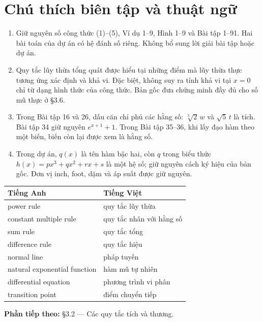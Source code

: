 \documentclass[12pt,a4paper]{article}
\begin{document}
\section*{Chú thích biên tập và thuật ngữ}
\begin{enumerate}[leftmargin=*]
\item Giữ nguyên số công thức (1)–(5), Ví dụ 1–9, Hình 1–9 và Bài tập 1–91. Hai bài toán của dự án có hệ đánh số riêng. Không bổ sung lời giải bài tập hoặc dự án.
\item Quy tắc lũy thừa tổng quát được hiểu tại những điểm mà lũy thừa thực tương ứng xác định và khả vi. Đặc biệt, không suy ra tính khả vi tại $x=0$ chỉ từ dạng hình thức của công thức. Bản gốc đưa chứng minh đầy đủ cho số mũ thực ở §3.6.
\item Trong Bài tập 16 và 26, dấu căn chỉ phủ các hằng số: $\sqrt[3]{2}\,w$ và $\sqrt5\,t$ là tích. Bài tập 34 giữ nguyên $e^{x+1}+1$. Trong Bài tập 35–36, khi lấy đạo hàm theo một biến, biến còn lại được xem là hằng số.
\item Trong dự án, $q(x)$ là tên hàm bậc hai, còn $q$ trong biểu thức $h(x)=px^3+qx^2+rx+s$ là một hệ số; giữ nguyên cách ký hiệu của bản gốc. Đơn vị inch, foot, dặm và áp suất được giữ nguyên.
\end{enumerate}
\begin{center}\begin{tabular}{ll}\toprule
Tiếng Anh&Tiếng Việt\\\midrule
power rule&quy tắc lũy thừa\\
constant multiple rule&quy tắc nhân với hằng số\\
sum rule&quy tắc tổng\\
difference rule&quy tắc hiệu\\
normal line&pháp tuyến\\
natural exponential function&hàm mũ tự nhiên\\
differential equation&phương trình vi phân\\
transition point&điểm chuyển tiếp\\\bottomrule
\end{tabular}\end{center}
\noindent\textbf{Phần tiếp theo:} §3.2 — Các quy tắc tích và thương.
\end{document}
